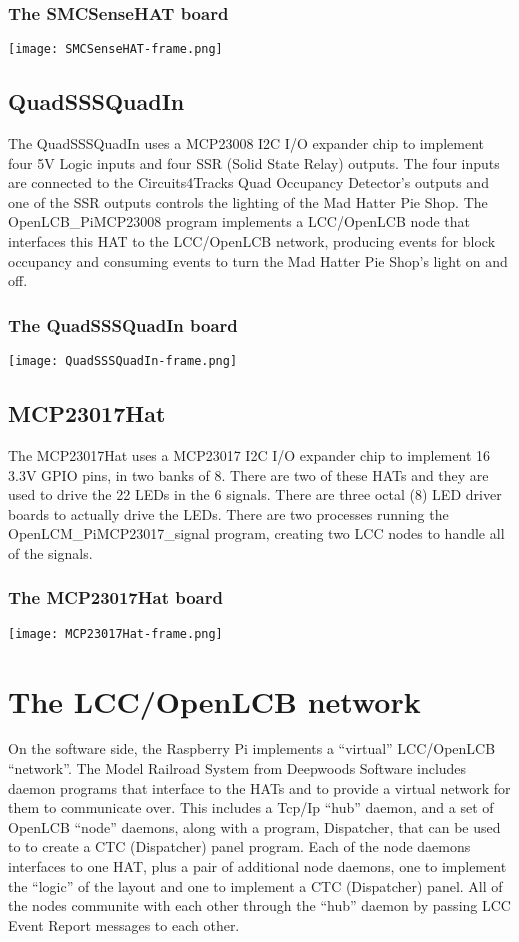 \documentclass[ignorenonframetext]{beamer}
\begin{document}
\begin{frame}
    \frametitle{The SMCSenseHAT board}
    \texttt{[image: SMCSenseHAT-frame.png]}
\end{frame}

\subsection{QuadSSSQuadIn}

The QuadSSSQuadIn uses a MCP23008 I2C I/O expander chip to implement four 5V 
Logic inputs and four SSR (Solid State Relay) outputs.  The four inputs are 
connected to the Circuits4Tracks Quad Occupancy Detector's outputs and one of 
the SSR outputs controls the lighting of the Mad Hatter Pie Shop.  The 
OpenLCB\_PiMCP23008 program implements a LCC/OpenLCB node that interfaces this 
HAT to the LCC/OpenLCB network, producing events for block occupancy and 
consuming events to turn the Mad Hatter Pie Shop's light on and off.

\begin{frame}
    \frametitle{The QuadSSSQuadIn board}
    \texttt{[image: QuadSSSQuadIn-frame.png]}
\end{frame}


\subsection{MCP23017Hat}

The MCP23017Hat uses a MCP23017 I2C I/O expander chip to implement 16 3.3V 
GPIO pins, in two banks of 8.  There are two of these HATs and they are used 
to drive the 22 LEDs in the 6 signals.  There are three octal (8) LED driver 
boards to actually drive the LEDs.  There are two processes running the 
OpenLCM\_PiMCP23017\_signal program, creating two LCC nodes to handle all of 
the signals.

\begin{frame}
   \frametitle{The MCP23017Hat board}
   \texttt{[image: MCP23017Hat-frame.png]}
\end{frame}

\section{The LCC/OpenLCB network}

On the software side, the Raspberry Pi implements a ``virtual'' LCC/OpenLCB
``network''. The Model Railroad System from Deepwoods Software includes daemon
programs that interface to the HATs and to provide a virtual network for them
to communicate over. This includes a Tcp/Ip ``hub'' daemon, and a set of
OpenLCB ``node'' daemons, along with a program, Dispatcher, that can be used
to to create a CTC (Dispatcher) panel program. Each of the node daemons
interfaces to one HAT, plus a pair of additional node daemons, one to
implement the ``logic'' of the layout and one to implement a CTC (Dispatcher)
panel. All of the nodes communite with each other through the ``hub'' daemon
by passing LCC Event Report messages to each other. 
\end{document}
